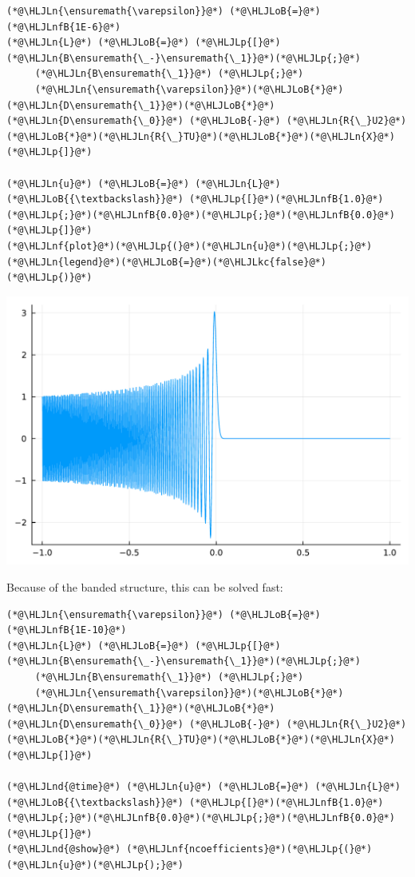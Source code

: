 \documentclass[12pt,a4paper]{article}
\newcommand{\HLJLkc}[1]{\textcolor[RGB]{59,151,46}{\textit{#1}}}
\newcommand{\HLJLn}[1]{#1}
\newcommand{\HLJLnd}[1]{\textcolor[RGB]{214,102,97}{#1}}
\newcommand{\HLJLnf}[1]{\textcolor[RGB]{66,102,213}{#1}}
\newcommand{\HLJLnfB}[1]{\textcolor[RGB]{59,151,46}{#1}}
\newcommand{\HLJLoB}[1]{\textcolor[RGB]{102,102,102}{\textbf{#1}}}
\newcommand{\HLJLp}[1]{#1}
\begin{document}
\begin{lstlisting}
(*@\HLJLn{\ensuremath{\varepsilon}}@*) (*@\HLJLoB{=}@*) (*@\HLJLnfB{1E-6}@*)
(*@\HLJLn{L}@*) (*@\HLJLoB{=}@*) (*@\HLJLp{[}@*)(*@\HLJLn{B\ensuremath{\_-}\ensuremath{\_1}}@*)(*@\HLJLp{;}@*)
     (*@\HLJLn{B\ensuremath{\_1}}@*) (*@\HLJLp{;}@*)
     (*@\HLJLn{\ensuremath{\varepsilon}}@*)(*@\HLJLoB{*}@*)(*@\HLJLn{D\ensuremath{\_1}}@*)(*@\HLJLoB{*}@*)(*@\HLJLn{D\ensuremath{\_0}}@*) (*@\HLJLoB{-}@*) (*@\HLJLn{R{\_}U2}@*)(*@\HLJLoB{*}@*)(*@\HLJLn{R{\_}TU}@*)(*@\HLJLoB{*}@*)(*@\HLJLn{X}@*)(*@\HLJLp{]}@*)

(*@\HLJLn{u}@*) (*@\HLJLoB{=}@*) (*@\HLJLn{L}@*) (*@\HLJLoB{{\textbackslash}}@*) (*@\HLJLp{[}@*)(*@\HLJLnfB{1.0}@*)(*@\HLJLp{;}@*)(*@\HLJLnfB{0.0}@*)(*@\HLJLp{;}@*)(*@\HLJLnfB{0.0}@*)(*@\HLJLp{]}@*)
(*@\HLJLnf{plot}@*)(*@\HLJLp{(}@*)(*@\HLJLn{u}@*)(*@\HLJLp{;}@*) (*@\HLJLn{legend}@*)(*@\HLJLoB{=}@*)(*@\HLJLkc{false}@*)(*@\HLJLp{)}@*)
\end{lstlisting}

\includegraphics[width=\linewidth]{jl_dOthw0/OP_methods_44_1.pdf}

Because of the banded structure, this can be solved fast:


\begin{lstlisting}
(*@\HLJLn{\ensuremath{\varepsilon}}@*) (*@\HLJLoB{=}@*) (*@\HLJLnfB{1E-10}@*)
(*@\HLJLn{L}@*) (*@\HLJLoB{=}@*) (*@\HLJLp{[}@*)(*@\HLJLn{B\ensuremath{\_-}\ensuremath{\_1}}@*)(*@\HLJLp{;}@*)
     (*@\HLJLn{B\ensuremath{\_1}}@*) (*@\HLJLp{;}@*)
     (*@\HLJLn{\ensuremath{\varepsilon}}@*)(*@\HLJLoB{*}@*)(*@\HLJLn{D\ensuremath{\_1}}@*)(*@\HLJLoB{*}@*)(*@\HLJLn{D\ensuremath{\_0}}@*) (*@\HLJLoB{-}@*) (*@\HLJLn{R{\_}U2}@*)(*@\HLJLoB{*}@*)(*@\HLJLn{R{\_}TU}@*)(*@\HLJLoB{*}@*)(*@\HLJLn{X}@*)(*@\HLJLp{]}@*)

(*@\HLJLnd{@time}@*) (*@\HLJLn{u}@*) (*@\HLJLoB{=}@*) (*@\HLJLn{L}@*) (*@\HLJLoB{{\textbackslash}}@*) (*@\HLJLp{[}@*)(*@\HLJLnfB{1.0}@*)(*@\HLJLp{;}@*)(*@\HLJLnfB{0.0}@*)(*@\HLJLp{;}@*)(*@\HLJLnfB{0.0}@*)(*@\HLJLp{]}@*)
(*@\HLJLnd{@show}@*) (*@\HLJLnf{ncoefficients}@*)(*@\HLJLp{(}@*)(*@\HLJLn{u}@*)(*@\HLJLp{);}@*)
\end{lstlisting}
\end{document}
